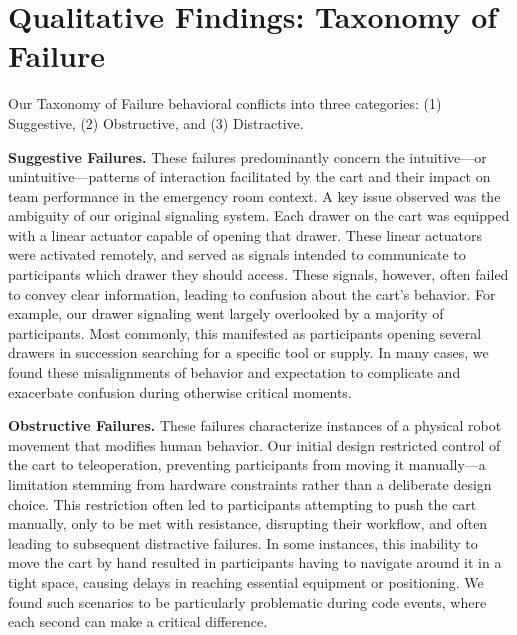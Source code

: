 \section{Qualitative Findings: Taxonomy of Failure}
\label{sec:qual_results}

Our Taxonomy of Failure behavioral conflicts into three categories: (1) Suggestive, (2) Obstructive, and (3) Distractive.

\textbf{Suggestive Failures.} These failures predominantly concern the intuitive—or unintuitive—patterns of interaction facilitated by the cart and their impact on team performance in the emergency room context. 
A key issue observed was the ambiguity of our original signaling system. 
Each drawer on the cart was equipped with a linear actuator capable of opening that drawer. 
These linear actuators were activated remotely, and served as signals intended to communicate to participants which drawer they should access. 
These signals, however, often failed to convey clear information, leading to confusion about the cart’s behavior. 
For example, our drawer signaling went largely overlooked by a majority of participants. 
Most commonly, this manifested as participants opening several drawers in succession searching for a specific tool or supply. 
In many cases, we found these misalignments of behavior and expectation to complicate and exacerbate confusion during otherwise critical moments.

\textbf{Obstructive Failures.} These failures characterize instances of a physical robot movement that modifies human behavior. %
Our initial design restricted control of the cart to teleoperation, preventing participants from moving it manually—a limitation stemming from hardware constraints rather than a deliberate design choice. 
This restriction often led to participants attempting to push the cart manually, only to be met with resistance, disrupting their workflow, and often leading to subsequent distractive failures. 
In some instances, this inability to move the cart by hand resulted in participants having to navigate around it in a tight space, causing delays in reaching essential equipment or positioning. 
We found such scenarios to be particularly problematic during code events, where each second can make a critical difference.

